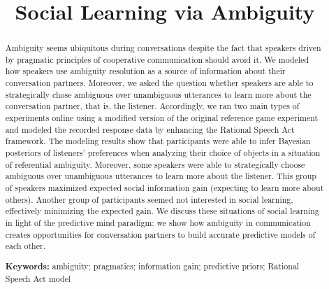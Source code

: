 \documentclass[10pt,a4paper]{article}
\title{Social Learning via Ambiguity}
\begin{document}
\maketitle

\begin{abstract}
Ambiguity seems ubiquitous during conversations despite the fact that speakers driven by pragmatic principles of cooperative communication \cite{grice1975} should avoid it. We modeled how speakers use ambiguity resolution as a source of information about their conversation partners.
Moreover, we asked the question whether speakers are able to strategically chose ambiguous over unambiguous utterances to learn more about the conversation partner, that is, the listener.
Accordingly, we ran two main types of experiments online using a modified version of the original reference game experiment \cite{frankgoodman2012} and modeled the recorded response data by enhancing the Rational Speech Act framework.
The modeling results show that participants were able to infer Bayesian posteriors of listeners' preferences when analyzing their choice of objects in a situation of referential ambiguity.
Moreover, some speakers were able to strategically choose ambiguous over unambiguous utterances to learn more about the listener.
This group of speakers maximized expected social information gain (expecting to learn more about others). Another group of participants seemed not interested in social learning, effectively minimizing the expected gain. 
We discuss these situations of social learning in light of the predictive mind paradigm: we show how ambiguity in communication creates opportunities for conversation partners to build accurate predictive models of each other.                                                                    

\textbf{Keywords:} 
ambiguity; pragmatics; information gain; predictive priors; Rational Speech Act model
\end{abstract}
\end{document}
